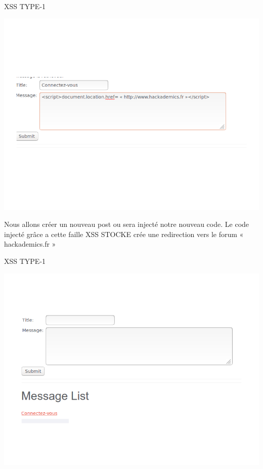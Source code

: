 \begin{itemize}
\begin{center}
\caption{XSS TYPE-1}
\includegraphics[scale=0.3]{Web/assets/xsst100.png}
\end{center}

\bigskip

\begin{flushleft}
Nous allons créer un nouveau post ou sera injecté notre nouveau code. Le code injecté grâce a cette faille XSS STOCKE crée une redirection vers le forum « hackademics.fr »
\end{flushleft}


\begin{center}
\caption{XSS TYPE-1}
\includegraphics[scale=0.3]{Web/assets/xsst101.png}
\end{center}


\end{itemize}
